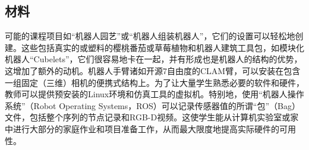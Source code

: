 
\subsection{材料}
可能的课程项目如“机器人园艺”或“机器人组装机器人”，它们的设置可以轻松地创建。这些包括真实的或塑料的樱桃番茄或草莓植物和机器人建筑工具包，如模块化机器人“Cubelets”，它们很容易地卡在一起，并有形成也是机器人的结构的优势，这增加了额外的动机。机器人手臂诸如开源7自由度的CLAM臂，可以安装在包含一组固定（三维）相机的便携式结构上。为了让大量学生熟悉必要的软​​件和硬件，教师可以提供预安装的Linux环境和仿真工具的虚拟机。特别地，使用“机器人操作系统”（Robot Operating Systems，ROS）可以记录传感器值的所谓“包”（Bag）文件，包括整个序列的节点记录和RGB-D视频。这使学生能从计算机实验室或家中进行大部分的家庭作业和项目准备工作，从而最大限度地提高实际硬件的可用性。


